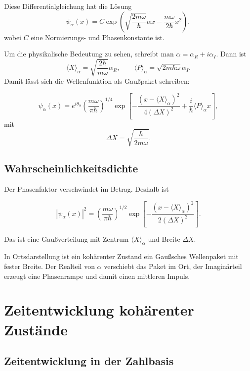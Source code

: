 \begin{derivationbox}
Diese Differentialgleichung hat die Lösung
\[
    \psi_\alpha(x)=C\exp\left(\sqrt{\frac{2m\omega}{\hbar}}\alpha x-
    \frac{m\omega}{2\hbar}x^2\right),
\]
wobei \(C\) eine Normierungs- und Phasenkonstante ist.
\end{derivationbox}

Um die physikalische Bedeutung zu sehen, schreibt man \(\alpha=\alpha_R+i\alpha_I\). Dann ist
\[
    \langle X\rangle_\alpha=\sqrt{\frac{2\hbar}{m\omega}}\alpha_R,
    \qquad
    \langle P\rangle_\alpha=\sqrt{2m\hbar\omega}\alpha_I.
\]
Damit lässt sich die Wellenfunktion als Gaußpaket schreiben:
\begin{formulabox}
\[
    \psi_\alpha(x)
    =e^{i\theta_\alpha}
    \left(\frac{m\omega}{\pi\hbar}\right)^{1/4}
    \exp\left[-\frac{(x-\langle X\rangle_\alpha)^2}{4(\Delta X)^2}
    +\frac{i}{\hbar}\langle P\rangle_\alpha x\right],
\]
mit
\[
    \Delta X=\sqrt{\frac{\hbar}{2m\omega}}.
\]
\end{formulabox}

\subsection{Wahrscheinlichkeitsdichte}

Der Phasenfaktor verschwindet im Betrag. Deshalb ist
\begin{formulabox}
\[
    |\psi_\alpha(x)|^2
    =\left(\frac{m\omega}{\pi\hbar}\right)^{1/2}
    \exp\left[-\frac{(x-\langle X\rangle_\alpha)^2}{2(\Delta X)^2}\right].
\]
\end{formulabox}

Das ist eine Gaußverteilung mit Zentrum \(\langle X\rangle_\alpha\) und Breite \(\Delta X\).

\begin{conceptbox}
In Ortsdarstellung ist ein kohärenter Zustand ein Gaußsches Wellenpaket mit fester Breite. Der Realteil von \(\alpha\) verschiebt das Paket im Ort, der Imaginärteil erzeugt eine Phasenrampe und damit einen mittleren Impuls.
\end{conceptbox}

\section{Zeitentwicklung kohärenter Zustände}

\subsection{Zeitentwicklung in der Zahlbasis}

